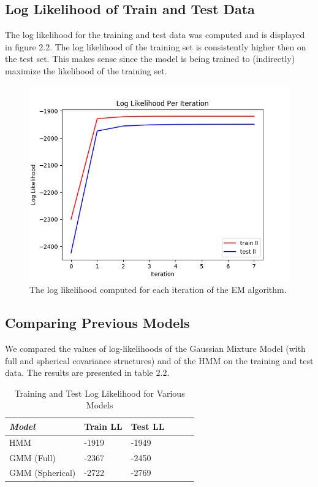 \documentclass[paper=a4, fontsize=11pt]{scrartcl} %
\numberwithin{equation}{section} %
\numberwithin{figure}{section} %
\numberwithin{table}{section} %
\begin{document}
\subsection{Log Likelihood of Train and Test Data}

The log likelihood for the training and test data was computed and is displayed in figure 2.2. The log likelihood of the training set is consistently higher then on the test set. This makes sense since the model is being trained to (indirectly) maximize the likelihood of the training set.

\begin{figure}
	\includegraphics[width=.9\linewidth]{ll_Plot.png}
	\caption{The log likelihood computed for each iteration of the EM algorithm.}
\end{figure}

\newpage

\subsection{Comparing Previous Models}
We compared the values of log-likelihoods of the Gaussian Mixture
Model (with full and spherical covariance structures) and of the HMM on the training and test data. The results are presented in table 2.2.

	\begin{table}
		\caption {Training and Test Log Likelihood for Various Models} \label{tab:title} 
		\begin{center}		
			\begin{tabular}{*6l}   
				\toprule
				\emph{Model}&  Train LL & Test LL  \\\midrule
				HMM & -1919 & -1949	\\
				GMM (Full) & -2367 & -2450 \\
				GMM (Spherical) & -2722 & -2769
				\\\bottomrule
				\hline
			\end{tabular}
		\end{center}
	\end{table}
\end{document}
